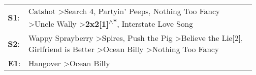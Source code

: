 \begin{supertabular}{p{0.03\textwidth}p{0.92\textwidth}}
 \textbf{S1}:  &             Catshot\textsuperscript{} \textgreater \enspace Search 4\textsuperscript{}, \enspace Partyin' Peeps\textsuperscript{}, \enspace Nothing Too Fancy\textsuperscript{} \textgreater \enspace Uncle Wally\textsuperscript{} \textgreater \enspace \textbf{2x2[1]\textsuperscript{$\wedge$*}}, \enspace Interstate Love Song\textsuperscript{}  \enspace  \\
 \textbf{S2}:  &  Wappy Sprayberry\textsuperscript{} \textgreater \enspace Spires\textsuperscript{}, \enspace Push the Pig\textsuperscript{} \textgreater \enspace Believe the Lie[2]\textsuperscript{}, \enspace Girlfriend is Better\textsuperscript{} \textgreater \enspace Ocean Billy\textsuperscript{} \textgreater \enspace Nothing Too Fancy\textsuperscript{}  \enspace  \\
 \textbf{E1}:  &                                                                                                                                                                                                                                                                        Hangover\textsuperscript{} \textgreater \enspace Ocean Billy\textsuperscript{}  \enspace  \\
\end{supertabular}
